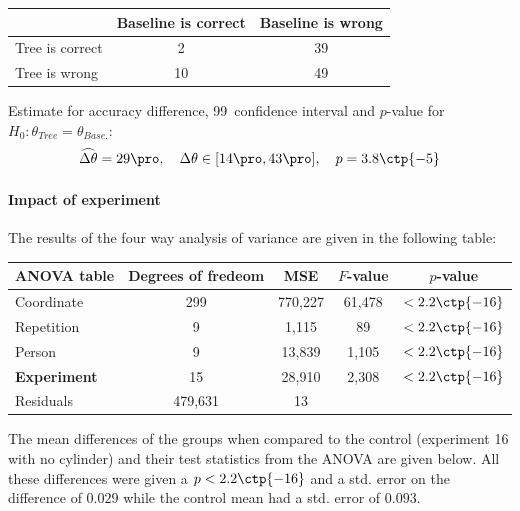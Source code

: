 \documentclass[11pt,fleqn]{article}
\begin{document}
\begin{table}[H]
	\centering
	\begin{tabular}{l|c c}
		&Baseline is correct& Baseline is wrong \\
		\hline
		Tree is correct &2& 39\\
		Tree is wrong& 10& 49
	\end{tabular}
\end{table}\noindent 
Estimate for accuracy difference, 99\pro\ confidence interval and \(p\)-value for \(H_0: \theta_{Tree}=\theta_{Base.}\):
\[
\widehat{\Delta \theta} = 29\pro,\quad  \Delta \theta\in[14\pro , 43\pro], \quad p = 3.8\ctp{-5}
\]

\paragraph{Impact of experiment} The results of the four way analysis of variance are given in the following table:

\begin{table}[H]
	\centering
	\begin{tabular}{l | c c c c}
		ANOVA table & Degrees of fredeom& MSE&\(F\)-value&\(p\)-value\\
		\hline 
		Coordinate  & 299 & 770,227 & 		61,478 	& \(<2.2\ctp{-16}\)	\\
		Repetition  & 9 &  1,115 & 			89	 	&\(<2.2\ctp{-16}\)  \\
		Person  & 9 & 13,839 &	 			1,105 	&\(<2.2\ctp{-16}\)	\\
		\textbf{Experiment}  & 15 &  28,910 & 2,308 & \(<2.2\ctp{-16}\)	\\
		Residuals &479,631 & 13 &			
	\end{tabular}
		\label{tab:ranova}
\end{table}\noindent
The mean differences of the groups when compared to the control (experiment 16 with no cylinder) and their test statistics from the ANOVA are given below. All these differences were given a \(p<2.2\ctp{-16}\) and a std. error on the difference of \(0.029\) while the control mean had a std. error of \(0.093\).
\end{document}
